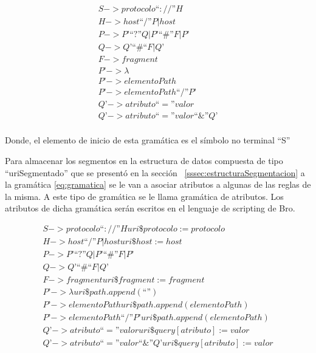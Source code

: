 \begin{equation}\label{eq:gramatica}
\begin{aligned}
S -> protocolo “ :// ” H  \\
H -> host “/” P | host \\
P -> P’ “?” Q | P’ “\#” F | P’ \\
Q -> Q’ “\#“ F | Q’ \\
F -> fragment \\
P’ -> \lambda \\
P’ ->  elementoPath \\
P’ -> elementoPath “/” P’ \\
Q’ -> atributo “=” valor \\
Q’ -> atributo “=” valor “\&” Q’ \\
\end{aligned}
\end{equation}

Donde, el elemento de inicio de esta gramática es el símbolo no terminal ``S''

Para almacenar los segmentos en la estructura de datos compuesta de tipo ``uriSegmentado'' que se presentó en la sección ~\ref{sssec:estructuraSegmentacion} a la gramática \ref{eq:gramatica} se le van a asociar atributos a algunas de las reglas de la misma. A este tipo de gramática se le llama gramática de atributos. Los atributos de dicha gramática serán escritos en el lenguaje de scripting de Bro.

\begin{equation}\label{eq:gramaticaAtributos}
\begin{aligned}
S -> protocolo “ :// ” H { uri\$protocolo := protocolo } \\
H -> host “/” P | host { uri\$host := host  } \\
P -> P’ “?” Q | P’ “\#” F | P’ \\
Q -> Q’ “\#“ F | Q’ \\
F -> fragment { uri\$fragment := fragment } \\
P’ -> \lambda  { uri\$path.append(“”) } \\
P’ ->  elementoPath { uri\$path.append(elementoPath) } \\
P’ -> elementoPath “/” P’ { uri\$path.append(elementoPath) } \\
Q’ -> atributo “=” valor { uri\$query[atributo] := valor } \\
Q’ -> atributo “=” valor “\&” Q’ { uri\$query[atributo] := valor } \\
\end{aligned}
\end{equation}

